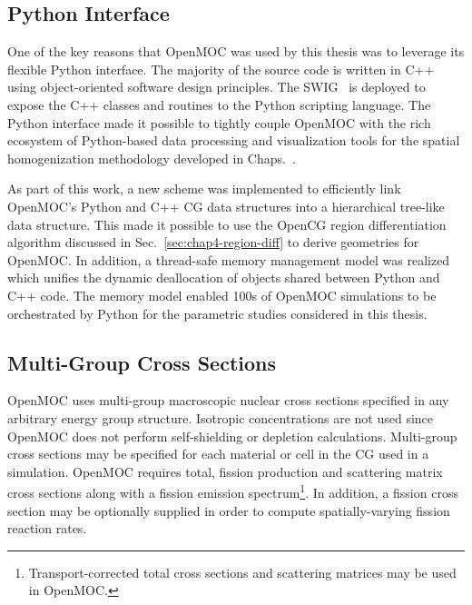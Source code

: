 \subsection{Python Interface}
\label{subsubsec:chap4-openmoc-python}

One of the key reasons that OpenMOC was used by this thesis was to leverage its flexible Python interface. The majority of the source code is written in C++ using object-oriented software design principles. The \ac{SWIG}~\cite{beazley2003swig} is deployed to expose the C++ classes and routines to the Python scripting language. The Python interface made it possible to tightly couple OpenMOC with the rich ecosystem of Python-based data processing and visualization tools for the spatial homogenization methodology developed in Chaps.~.

As part of this work, a new scheme was implemented to efficiently link OpenMOC's Python and C++ \ac{CG} data structures into a hierarchical tree-like data structure. This made it possible to use the OpenCG region differentiation algorithm discussed in Sec.~\ref{sec:chap4-region-diff} to derive geometries for OpenMOC. In addition, a thread-safe memory management model was realized which unifies the dynamic deallocation of objects shared between Python and C++ code. The memory model enabled 100s of OpenMOC simulations to be orchestrated by Python for the parametric studies considered in this thesis.


\subsection{Multi-Group Cross Sections}
\label{subsubsec:chap4-openmoc-mgxs}

OpenMOC uses multi-group macroscopic nuclear cross sections specified in any arbitrary energy group structure. Isotropic concentrations are not used since OpenMOC does not perform self-shielding or depletion calculations. Multi-group cross sections may be specified for each material or cell in the \ac{CG} used in a simulation. OpenMOC requires total, fission production and scattering matrix cross sections along with a fission emission spectrum\footnote{Transport-corrected total cross sections and scattering matrices may be used in OpenMOC.}. In addition, a fission cross section may be optionally supplied in order to compute spatially-varying fission reaction rates.

